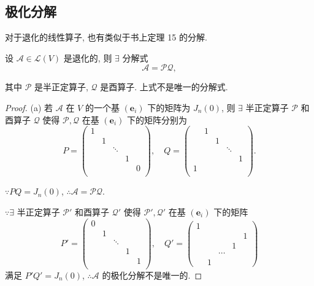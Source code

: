 \documentclass{ctexart}
\begin{document}
\subsection{极化分解}
对于退化的线性算子, 也有类似于书上定理 15 的分解.
\begin{theorem}
    设 $\mathcal{A}\in\mathcal{L}(V)$ 是退化的, 则 $\exists$ 分解式
    \[\mathcal{A}=\mathcal{PQ},\]

    其中 $\mathcal{P}$ 是半正定算子, $\mathcal{Q}$ 是酉算子. 上式不是唯一的分解式.
\end{theorem}
\begin{proof}
    (a) 若 $\mathcal{A}$ 在 $V$ 的一个基 $(\boldsymbol{e}_i)$ 下的矩阵为 $J_n(0)$, 则 $\exists$ 半正定算子 $\mathcal{P}$ 和酉算子 $\mathcal{Q}$ 使得 $\mathcal{P},\mathcal{Q}$ 在基 $(\boldsymbol{e}_i)$ 下的矩阵分别为
    \[P=\begin{pmatrix}
        1 \\
        & 1 \\
        && \ddots \\
        &&& 1 \\
        &&&& 0 \\
    \end{pmatrix},\quad Q=\begin{pmatrix}
        & 1 \\
        && 1 \\
        &&& \ddots \\
        &&&& 1 \\
        1 \\
    \end{pmatrix}.\]

    $\because PQ=J_n(0)$, $\therefore\mathcal{A}=\mathcal{PQ}$.

    $\because\exists$ 半正定算子 $\mathcal{P}'$ 和酉算子 $\mathcal{Q}'$ 使得 $\mathcal{P}',\mathcal{Q}'$ 在基 $(\boldsymbol{e}_i)$ 下的矩阵
    \[P'=\begin{pmatrix}
        0 \\
        & 1 \\
        && \ddots \\
        &&& 1 \\
        &&&& 1 \\
    \end{pmatrix},\quad Q'=\begin{pmatrix}
        1 \\
        &&&& 1 \\
        &&& 1 \\
        && \cdots \\
        & 1
    \end{pmatrix}\]
    满足 $P'Q'=J_n(0)$, $\therefore\mathcal{A}$ 的极化分解不是唯一的.


\end{proof}
\end{document}
